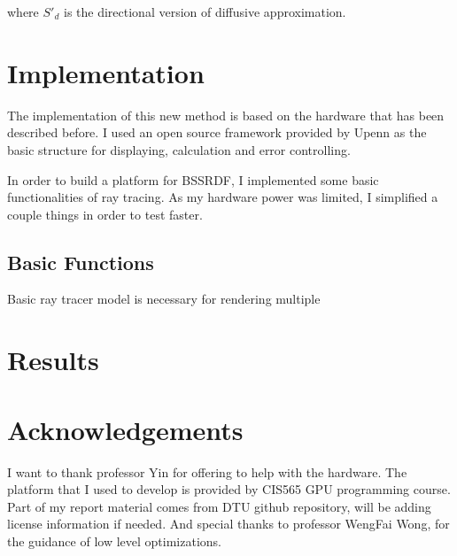 \documentclass[11pt]{article}
\begin{document}
where $S'_d$ is the directional version of diffusive approximation.


\section{Implementation}
\label{sec:orgheadline7}
The implementation of this new method is based on the hardware that has been described before. 
I used an open source  framework provided by Upenn as the basic structure for displaying, calculation 
and error controlling. 

In order to build a platform for BSSRDF, I implemented some basic functionalities of ray tracing. As my hardware power was limited, 
I simplified a couple things in order to test faster. 
\subsection{Basic Functions}
\label{sec:orgheadline5}
Basic ray tracer model is necessary for rendering multiple 
\subsection{}
\label{sec:orgheadline6}

\section{Results}
\label{sec:orgheadline8}



\section{Acknowledgements}
\label{sec:orgheadline9}
I want to thank professor Yin for offering to help with the hardware. 
The platform  that I used to develop is provided by CIS565 GPU programming course. 
Part of my report material comes from DTU github repository, will be adding license information if needed.
And special thanks to professor WengFai Wong, for the guidance of low level optimizations. 
\end{document}
